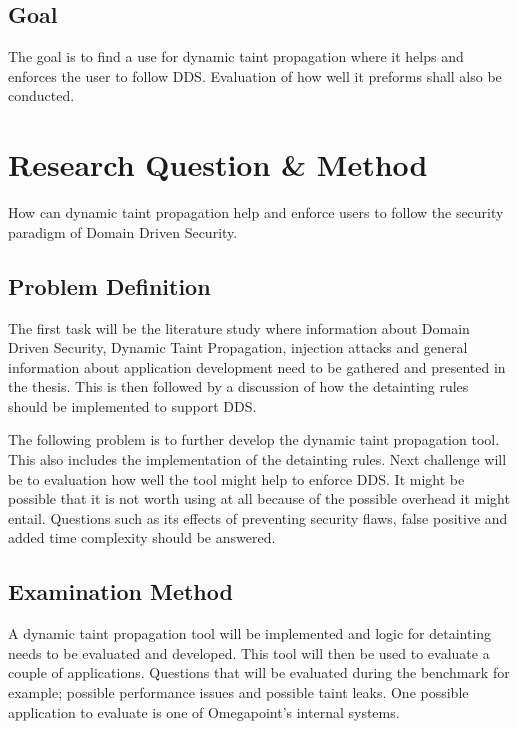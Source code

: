 \documentclass{../kththesis}
\begin{document}
\section{Goal}
The goal is to find a use for dynamic taint propagation where it helps and enforces the user to follow DDS. Evaluation of how well it preforms shall also be conducted.



\chapter{Research Question \& Method}
How can dynamic taint propagation help and enforce users to follow the security paradigm of Domain Driven Security.


\section{Problem Definition}
The first task will be the literature study where information about Domain Driven Security, Dynamic Taint Propagation, injection attacks and general information about application development need to be gathered and presented in the thesis. This is then followed by a discussion of how the detainting rules should be implemented to support DDS. 

The following problem is to further develop the dynamic taint propagation tool. This also includes the implementation of the detainting rules. Next challenge will be to evaluation how well the tool might help to enforce DDS. It might be possible that it is not worth using at all because of the possible overhead it might entail. Questions such as its effects of preventing security flaws, false positive and added time complexity should be answered.


\section{Examination Method}
A dynamic taint propagation tool will be implemented and logic for detainting needs to be evaluated and developed. This tool will then be used to evaluate a couple of applications. Questions that will be evaluated during the benchmark for example; possible performance issues and possible taint leaks. One possible application to evaluate is one of Omegapoint's internal systems.
\end{document}
